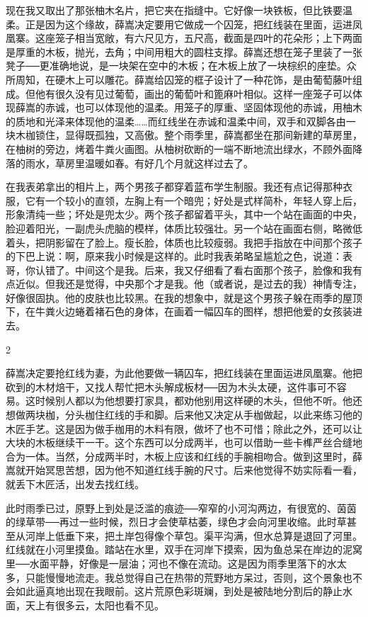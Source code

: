 现在我又取出了那张柚木名片，把它夹在指缝中。它好像一块铁板，但比铁要温柔。正是因为这个缘故，薛嵩决定要用它做成一个囚笼，把红线装在里面，运进凤凰寨。这座笼子相当宽敞，有六尺见方，五尺高，截面是四叶的花朵形；上下两面是厚重的木板，抛光，去角；中间用粗大的圆柱支撑。薛嵩还想在笼子里装了一张凳子──更准确地说，是一块架在空中的木板；在木板上放了一块棕织的座垫。众所周知，在硬木上可以雕花。薛嵩给囚笼的框子设计了一种花饰，是由葡萄藤叶组成。但他有很久没有见过葡萄，画出的葡萄叶和篦麻叶相似。这样一座笼子可以体现薛嵩的赤诚，也可以体现他的温柔。用笼子的厚重、坚固体现他的赤诚，用柚木的质地和光泽来体现他的温柔……而红线坐在赤诚和温柔中间，双手和双脚各由一块木枷锁住，显得既孤独，又高傲。整个雨季里，薛嵩都坐在那间新建的草房里，在柚树的旁边，烤着牛粪火画图。从柚树砍断的一端不断地流出绿水，不顾外面降落的雨水，草房里温暖如春。有好几个月就这样过去了。 

在我表弟拿出的相片上，两个男孩子都穿着蓝布学生制服。我还有点记得那种衣服，它有一个较小的直领，左胸上有一个暗兜；好处是式样简朴，年轻人穿上后，形象清纯一些；坏处是兜太少。两个孩子都留着平头，其中一个站在画面的中央，脸迎着阳光，一副虎头虎脑的模样，体质比较强壮。另一个站在画面右侧，略微低着头，把阴影留在了脸上。瘦长脸，体质也比较瘦弱。我把手指放在中间那个孩子的下巴上说：啊，原来我小时候是这样的。此时我表弟略呈尴尬之色，说道：表哥，你认错了。中间这个是我。后来，我又仔细看了看右面那个孩子，脸像和我有点近似。但我还是觉得，中央那个才是我。他（或者说，是过去的我）神情专注，好像很固执。他的皮肤也比较黑。在我的想象中，就是这个男孩子躲在雨季的屋顶下，在牛粪火边蜷着褚石色的身体，在画着一幅囚车的图样，想把他爱的女孩装进去。 

2 

薛嵩决定要抢红线为妻，为此他要做一辆囚车，把红线装在里面运进凤凰寨。他把砍到的木材焙干，又找人帮忙把木头解成板材──因为木头太硬，这件事可不容易。这时候别人都以为他想要打家具，都劝他别用这样硬的木头，但他不听。他还想做两块枷，分头枷住红线的手和脚。后来他又决定从手枷做起，以此来练习他的木匠手艺。这是因为做手枷用的木料有限，做坏了也不可惜；除此之外，还可以让大块的木板继续干一干。这个东西可以分成两半，也可以借助一些卡榫严丝合缝地合为一体。当然，分成两半时，木板上应该和红线的手腕相吻合。做到这里时，薛嵩就开始冥思苦想，因为他不知道红线手腕的尺寸。后来他觉得不妨实际看一看，就丢下木匠活，出发去找红线。 

此时雨季已过，原野上到处是泛滥的痕迹──窄窄的小河沟两边，有很宽的、茵茵的绿草带──再过一些时候，烈日才会使草枯萎，绿色才会向河里收缩。此时草甚至从河岸上低垂下来，把土岸包得像个草包。渠平沟满，但水总算是退回了河里。红线就在小河里摸鱼。踏站在水里，双手在河岸下摸索，因为鱼总呆在岸边的泥窝里──水面平静，好像是一层油；河也不像在流动。这是因为雨季里落下的水太多，只能慢慢地流走。我总觉得自己在热带的荒野地方呆过，否则，这个景象也不会如此逼真地出现在我眼前。这片荒原色彩斑斓，到处是被陆地分割后的静止水面，天上有很多云，太阳也看不见。 

